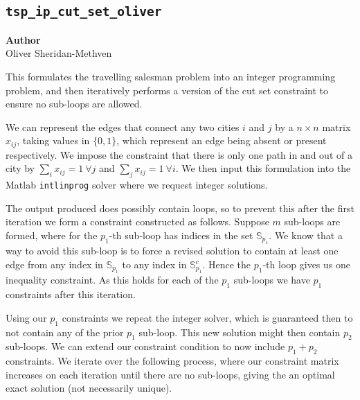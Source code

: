 \subsection{\texttt{tsp\_ip\_cut\_set\_oliver}}
\label{subsec:tsp_ip_cut_set_oliver}

\begin{flushright}
\textbf{Author} \\
Oliver Sheridan-Methven
\end{flushright}

This formulates the travelling salesman problem into an integer programming problem, and then iteratively performs a version of the cut set constraint  to ensure no sub-loops are allowed.

We can represent the edges that connect any two cities $ i $ and $ j $ by a $ n \times n $ matrix $ x_{ij} $, taking values in $ \{0, 1\} $, which represent an edge being absent or present respectively. We impose the constraint that there is only one path in and out of a city by $ \sum_{i} x_{ij} = 1 \: \forall j $ and  $ \sum_{j} x_{ij} = 1 \: \forall i $. We then input this formulation into the Matlab \verb|intlinprog| solver where we request integer solutions.

The output produced does possibly contain loops, so to prevent this after the first iteration we form a constraint constructed as follows. Suppose $ m $ sub-loops are formed, where for the $ p_1 $-th sub-loop has indices in the set $ \mathbb{S}_{p_1} $. We know that a way to avoid this sub-loop is to force a revised solution to contain at least one edge from any index in $ \mathbb{S}_{p_1} $ to any index in $ \mathbb{S}_{p_1}^c $. Hence the $ p_1 $-th loop gives us one inequality constraint. As this holds for each of the ${p_1} $ sub-loops we have ${p_1} $ constraints after this iteration.

Using our $ {p_1} $ constraints we repeat the integer solver, which is guaranteed then to not contain any of the prior $ {p_1} $ sub-loop. This new solution might then contain ${p_2} $ sub-loops. We can extend our constraint condition to now include $ p_1 + p_2 $ constraints. We iterate over the following process, where our constraint matrix increases on each iteration until there are no sub-loops, giving the an optimal exact solution (not necessarily unique).




